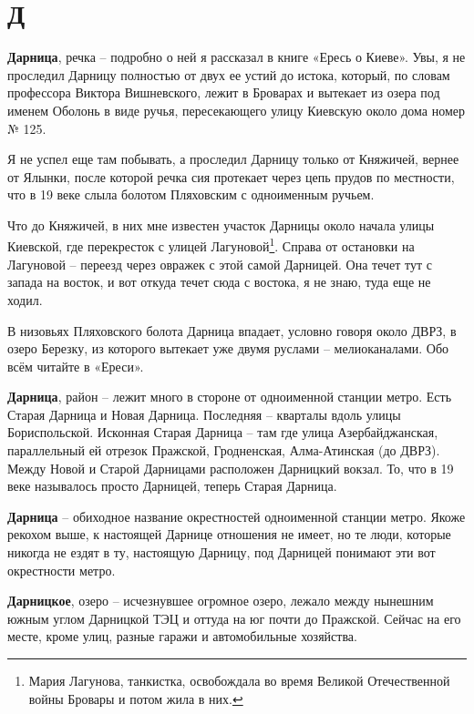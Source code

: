 \chapter*{Д}

\textbf{Дарница}, речка – подробно о ней я рассказал в книге «Ересь о Киеве». Увы, я не проследил Дарницу полностью от двух ее устий до истока, который, по словам профессора Виктора Вишневского, лежит в Броварах и вытекает из озера под именем Оболонь в виде ручья, пересекающего улицу Киевскую около дома номер № 125.

Я не успел еще там побывать, а проследил Дарницу только от Княжичей, вернее от Ялынки, после которой речка сия протекает через цепь прудов по местности, что в 19 веке слыла болотом Пляховским с одноименным ручьем.

Что до Княжичей, в них мне известен участок Дарницы около начала улицы Киевской, где перекресток с улицей Лагуновой\footnote{Мария Лагунова, танкистка, освобождала во время Великой Отечественной войны Бровары и потом жила в них.}. Справа от остановки на Лагуновой – переезд через овражек с этой самой Дарницей. Она течет тут с запада на восток, и вот откуда течет сюда с востока, я не знаю, туда еще не ходил.

В низовьях Пляховского болота Дарница впадает, условно говоря около ДВРЗ, в озеро Березку, из которого вытекает уже двумя руслами – мелиоканалами. Обо всём читайте в «Ереси».\\

\medskip

\textbf{Дарница}, район – лежит много в стороне от одноименной станции метро. Есть Старая Дарница и Новая Дарница. Последняя – кварталы вдоль улицы Бориспольской. Исконная Старая Дарница – там где улица Азербайджанская, параллельный ей отрезок Пражской, Гродненская, Алма-Атинская (до ДВРЗ). Между Новой и Старой Дарницами расположен Дарницкий вокзал. То, что в 19 веке называлось просто Дарницей, теперь Старая Дарница.\\

\medskip

\textbf{Дарница} – обиходное название окрестностей одноименной станции метро. Якоже рекохом выше, к настоящей Дарнице отношения не имеет, но те люди, которые никогда не ездят в ту, настоящую Дарницу, под Дарницей понимают эти вот окрестности метро.\\

\medskip


\textbf{Дарницкое}, озеро – исчезнувшее огромное озеро, лежало между нынешним южным углом Дарницкой ТЭЦ и оттуда на юг почти до Пражской. Сейчас на его месте, кроме улиц, разные гаражи и автомобильные хозяйства.

